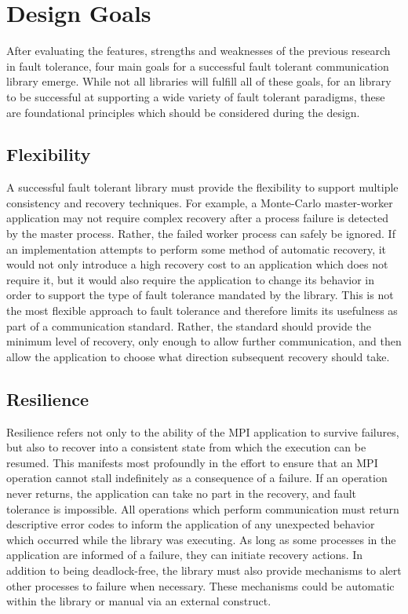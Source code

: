 \chapter{Design Goals}\label{chap:goals}

After evaluating the features, strengths and weaknesses of the previous research
in fault tolerance, four main goals for a successful fault tolerant communication library
emerge. While not all libraries will fulfill all of these goals, for an \mpi
library to be successful at supporting a wide variety of fault tolerant
paradigms, these are foundational principles which should be considered during 
the design.

\section{Flexibility}\label{sect:goals:flexibility}

A successful fault tolerant library must provide the flexibility to support
multiple consistency and recovery techniques. For example, a Monte-Carlo
master-worker application may not require complex recovery after a process
failure is detected by the master process. Rather, the failed worker process can
safely be ignored. If an \mpi implementation attempts to perform some method of
automatic recovery, it would not only introduce a high recovery cost to an
application which does not require it, but it would also require the application
to change its behavior in order to support the type of fault tolerance mandated
by the library. This is not the most flexible approach to fault tolerance and
therefore limits its usefulness as part of a communication standard.
Rather, the standard should provide the minimum level of recovery, only
enough to allow further communication, and then allow the application to choose
what direction subsequent recovery should take.

\section{Resilience}\label{sect:goals:resiliency}

Resilience refers not only to the ability of the MPI application to survive
failures, but also to recover into a consistent state from which the execution
can be resumed. This manifests most profoundly in the effort to ensure that an
MPI operation cannot stall indefinitely as a consequence of a failure. If an
operation never returns, the application can take no part in the recovery, and
fault tolerance is impossible. All operations which perform communication must
return descriptive error codes to inform the application of any unexpected
behavior which occurred while the library was executing. As long as some
processes in the application are informed of a failure, they can initiate
recovery actions. In addition to being deadlock-free, the library must also
provide mechanisms to alert other processes to failure when necessary. These
mechanisms could be automatic within the library or manual via an external construct.

